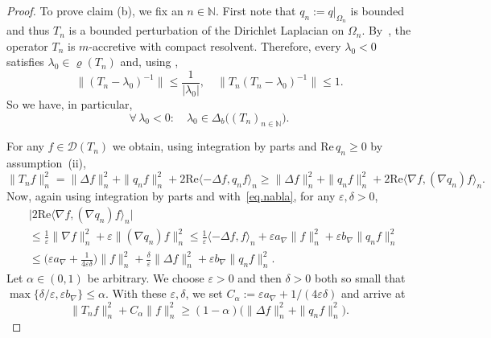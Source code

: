 \documentclass[a4paper,reqno]{amsart}
\begin{document}
\begin{proof}
To prove claim (b), we fix an $n\in{\mathbb{N}}$. First note that $q_n:=q|_{\Omega_n}$ is bounded and thus $T_n$ is a bounded perturbation of the Dirichlet Laplacian on $\Omega_n$.
By~\cite[Theorem~VI.1.4]{edmundsevans}, the operator $T_n$ is $m$-accretive with compact resolvent. 
Therefore, every $\lambda_0<0$ satisfies $\lambda_0\in\varrho(T_n)$ and, using \cite[Problem~V.3.31]{kato},
\begin{equation} \|(T_n-\lambda_0)^{-1}\|\leq \frac{1}{|\lambda_0|}, \quad \|T_n(T_n-\lambda_0)^{-1}\|\leq 1.\label{eq.accretive}\end{equation}
So we have, in particular, 
\begin{equation}\label{eq.neglminDeltab}
\forall\,\lambda_0<0:\quad \lambda_0 \in\Delta_b\big((T_n)_{n\in{\mathbb{N}}}\big).
\end{equation}

For any $f\in {\mathcal D}(T_n)$ we obtain, using integration by parts and ${\mathrm{Re}}\,q_n\geq 0$ by assumption~(ii), 
$$\|T_nf\|_n^2=\!\|\Delta f\|_n^2+\|q_nf\|_n^2+2{\mathrm{Re}} \langle -\Delta f,q_nf\rangle_n\!\geq\! \|\Delta f\|_n^2+\|q_nf\|_n^2+2{\mathrm{Re}} \langle \nabla f,\!(\nabla q_n)f\rangle_n.$$ 
Now, again using integration by parts  and with~\eqref{eq.nabla}, for any $\varepsilon,\delta>0$,
\begin{align*}
&\big| 2 {\mathrm{Re}} \langle \nabla f,(\nabla q_n)f\rangle_n\big|\\
&\leq \frac{1}\varepsilon\|\nabla f\|_n^2+\varepsilon \|(\nabla q_n)f\|_n^2
\leq \frac{1}\varepsilon\langle -\Delta f,f\rangle_n + \varepsilon a_{\nabla}\|f\|_n^2+\varepsilon b_{\nabla} \|q_nf\|_n^2\\
&\leq \bigg(\varepsilon a_{\nabla}+\frac{1}{4 \varepsilon\delta}\bigg)\|f\|_n^2+\frac{\delta}\varepsilon\|\Delta f\|_n^2+\varepsilon b_{\nabla}\|q_nf\|_n^2.
\end{align*}
Let $\alpha\in (0,1)$ be arbitrary. We choose $\varepsilon>0$ and then $\delta>0$ both so small that $\max\{\delta/\varepsilon,\varepsilon b_{\nabla}\}\leq \alpha$.
With these $\varepsilon, \delta$, we set $C_{\alpha}:=\varepsilon a_{\nabla} +1/(4\varepsilon\delta)$  and arrive at 
\begin{equation} \|T_nf\|_n^2+C_{\alpha} \|f\|_n^2\geq (1-\alpha)\big(\|\Delta f\|_n^2+\|q_nf\|_n^2\big).\label{eq.normequiv}\end{equation}


\end{proof}
\end{document}

